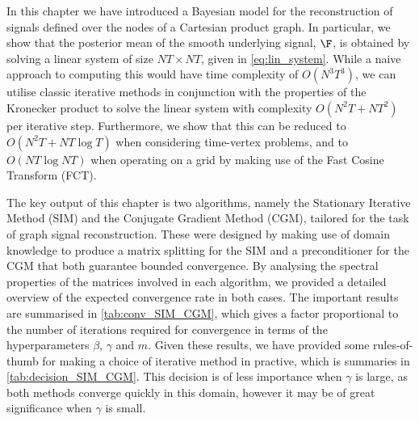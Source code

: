 In this chapter we have introduced a Bayesian model for the reconstruction of signals defined over the nodes of a Cartesian product graph. In particular, we show that the posterior mean of the smooth underlying signal, $\F$, is obtained by solving a linear system of size $NT \times NT$, given in \cref{eq:lin_system}. While a naive approach to computing this would have time complexity of $O(N^3T^3)$, we can utilise classic iterative methods in conjunction with the properties of the Kronecker product to solve the linear system with complexity $O(N^2T + NT^2)$ per iterative step. Furthermore, we show that this can be reduced to $O(N^2T + NT \log T)$ when considering time-vertex problems, and to $O(NT \log NT)$ when operating on a grid by making use of the Fast Cosine Transform (FCT). 

The key output of this chapter is two algorithms, namely the Stationary Iterative Method (SIM) and the Conjugate Gradient Method (CGM), tailored for the task of graph signal reconstruction. These were designed by making use of domain knowledge to produce a matrix splitting for the SIM and a preconditioner for the CGM that both guarantee bounded convergence. By analysing the spectral properties of the matrices involved in each algorithm, we provided a detailed overview of the expected convergence rate in both cases. The important results are summarised in \cref{tab:conv_SIM_CGM}, which gives a factor proportional to the number of iterations required for convergence in terms of the hyperparameters $\beta$, $\gamma$ and $m$. Given these results, we have provided some rules-of-thumb for making a choice of iterative method in practive, which is summaries in \cref{tab:decision_SIM_CGM}. This decision is of less importance when $\gamma$ is large, as both methods converge quickly in this domain, however it may be of great significance when $\gamma$ is small. 


